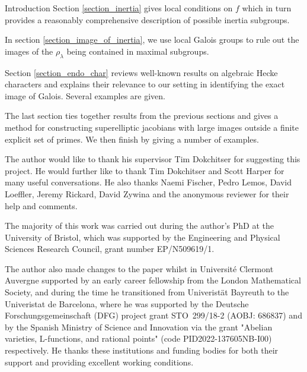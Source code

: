 \documentclass[11pt,a4paper]{article}
\begin{document}
\begin{section}{Introduction}
Section \ref{section_inertia} gives local conditions on $f$ which in turn provides a reasonably comprehensive description of possible inertia subgroups.

In section \ref{section_image_of_inertia}, we use local Galois groups to rule out the images of the $\rho_\lambda$ being contained in maximal subgroups.

Section \ref{section_endo_char} reviews well-known results on algebraic Hecke characters and explains their relevance to our setting in identifying the exact image of Galois.
Several examples are given.

The last section ties together results from the previous sections and gives a method for constructing superelliptic jacobians with large images outside a finite explicit set of primes.
We then finish by giving a number of examples.



\begin{acknowledgements}
The author would like to thank his supervisor Tim Dokchitser for suggesting this project. He would further like to thank Tim Dokchitser and Scott Harper for many useful conversations.
He also thanks Naemi Fischer, Pedro Lemos, David Loeffler, Jeremy Rickard, David Zywina and the anonymous reviewer for their help and comments.

The majority of this work was carried out during the author's PhD at the University of Bristol, which was supported by the Engineering and Physical Sciences Research Council, grant number EP/N509619/1.

The author also made changes to the paper whilst in Université Clermont Auvergne supported by an early career fellowship from the London Mathematical Society, and during the time he transitioned from Univeristät Bayreuth to the Univeristat de Barcelona, where he was supported by the Deutsche Forschungsgemeinschaft (DFG) project grant STO~299/18-2 (AOBJ: 686837) and by the Spanish Ministry of Science and Innovation via the grant "Abelian varieties, L-functions, and rational points" (code PID2022-137605NB-I00) respectively.
He thanks these institutions and funding bodies for both their support and providing excellent working conditions.

\end{acknowledgements}

    
\end{section}
\end{document}
